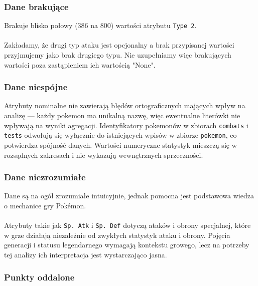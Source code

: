 \documentclass[12pt, a4paper]{report}
\begin{document}
\subsubsection{Dane brakujące}
Brakuje blisko połowy (386 na 800) wartości atrybutu \texttt{Type 2}.\\\\ \noindent
Zakładamy, że drugi typ ataku jest opcjonalny a brak przypisanej wartości przyjmujemy jako brak drugiego typu. Nie uzupełniamy więc brakujących wartości poza zastąpieniem ich wartością "None".


\subsubsection{Dane niespójne}

Atrybuty nominalne nie zawierają błędów ortograficznych mających wpływ na analizę — każdy pokemon ma unikalną nazwę, więc ewentualne literówki nie wpływają na wyniki agregacji.
Identyfikatory pokemonów w zbiorach \texttt{combats} i \texttt{tests} odwołują się wyłącznie do istniejących wpisów w zbiorze \texttt{pokemon}, co potwierdza spójność danych. Wartości numeryczne statystyk mieszczą się w rozsądnych zakresach i nie wykazują wewnętrznych sprzeczności.


\subsubsection{Dane niezrozumiałe}

Dane są na ogół zrozumiałe intuicyjnie, jednak pomocna jest podstawowa wiedza o mechanice gry Pokémon.\\\\ \noindent Atrybuty takie jak \texttt{Sp. Atk} i \texttt{Sp. Def} dotyczą ataków i obrony specjalnej, które w grze działają niezależnie od zwykłych statystyk ataku i obrony. Pojęcia generacji i statusu legendarnego wymagają kontekstu growego, lecz na potrzeby tej analizy ich interpretacja jest wystarczająco jasna.

\subsubsection{Punkty oddalone}
\end{document}
